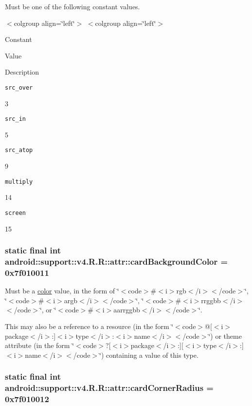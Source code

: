 Must be one of the following constant values. \begin{TabularC}{0}
\hline
\end{TabularC}
$<$colgroup align=\char`\"{}left\char`\"{}$>$ $<$colgroup align=\char`\"{}left\char`\"{}$>$ 

Constant

Value

Description 

{\tt src\_\-over}

3

{\tt src\_\-in}

5

{\tt src\_\-atop}

9

{\tt multiply}

14

{\tt screen}

15\hypertarget{classandroid_1_1support_1_1v4_1_1_r_1_1attr_c58901e4bf9f6d04fbca50f613b2ba49}{
\subsubsection[{cardBackgroundColor}]{\setlength{\rightskip}{0pt plus 5cm}static final int android::support::v4.R.R::attr::cardBackgroundColor = 0x7f010011}}
\label{classandroid_1_1support_1_1v4_1_1_r_1_1attr_c58901e4bf9f6d04fbca50f613b2ba49}


Must be a \hyperlink{classandroid_1_1support_1_1v4_1_1_r_1_1color}{color} value, in the form of \char`\"{}$<$code$>$\#$<$i$>$rgb$<$/i$>$$<$/code$>$\char`\"{}, \char`\"{}$<$code$>$\#$<$i$>$argb$<$/i$>$$<$/code$>$\char`\"{}, \char`\"{}$<$code$>$\#$<$i$>$rrggbb$<$/i$>$$<$/code$>$\char`\"{}, or \char`\"{}$<$code$>$\#$<$i$>$aarrggbb$<$/i$>$$<$/code$>$\char`\"{}. 

This may also be a reference to a resource (in the form \char`\"{}$<$code$>$@\mbox{[}$<$i$>$package$<$/i$>$:\mbox{]}$<$i$>$type$<$/i$>$:$<$i$>$name$<$/i$>$$<$/code$>$\char`\"{}) or theme attribute (in the form \char`\"{}$<$code$>$?\mbox{[}$<$i$>$package$<$/i$>$:\mbox{]}\mbox{[}$<$i$>$type$<$/i$>$:\mbox{]}$<$i$>$name$<$/i$>$$<$/code$>$\char`\"{}) containing a value of this type. \hypertarget{classandroid_1_1support_1_1v4_1_1_r_1_1attr_6da47afa46df6a4f673cbe0681783d7a}{
\subsubsection[{cardCornerRadius}]{\setlength{\rightskip}{0pt plus 5cm}static final int android::support::v4.R.R::attr::cardCornerRadius = 0x7f010012}}
\label{classandroid_1_1support_1_1v4_1_1_r_1_1attr_6da47afa46df6a4f673cbe0681783d7a}


